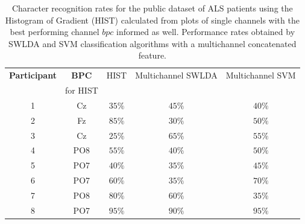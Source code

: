 \documentclass[utf8]{frontiersSCNS} %
\begin{document}
\begin{table}[htb]
\caption{Character recognition rates for the public dataset of ALS patients using the Histogram of Gradient (HIST) calculated from plots of single channels with the best performing channel $bpc$ informed as well.   Performance rates obtained by SWLDA and SVM classification algorithms with a multichannel concatenated feature.}
\centering
\begin{tabular}{c|cc|c|c}
\toprule
\textbf{Participant}	&  \textbf{BPC}	&  HIST & Multichannel SWLDA & Multichannel SVM \\
                                    &  for HIST        &           &                                       &   \\
\midrule
1     &     Cz   &   $35\%$  & $45\%$  & $40\%$\\
2     &     Fz   &   $85\%$  & $30\%$   & $50\%$   \\
3     &     Cz   &   $25\%$  & $65\%$ & $55\%$   \\
4     &     PO8 &   $55\%$ & $40\%$  & $50\%$   \\
5     &     PO7 &   $40\%$ & $35\%$  & $45\%$   \\
6     &     PO7 &   $60\%$ &  $35\%$  & $70\%$   \\
7     &     PO8 &   $80\%$ & $60\%$   & $35\%$   \\
8     &     PO7 &   $95\%$  & $90\%$   & $95\%$  \\

\end{tabular}
\label{tab:resultsalsswlda}
\end{table}
\end{document}
